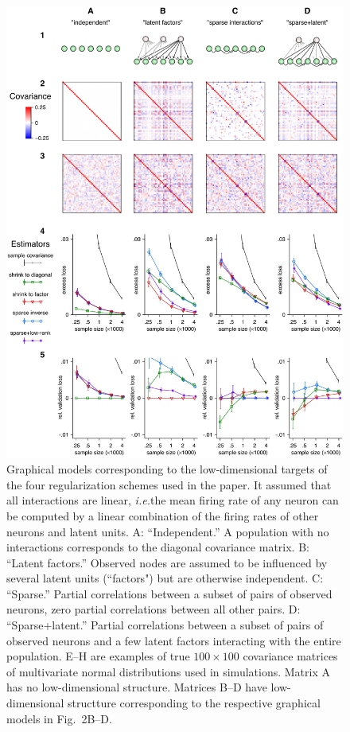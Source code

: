 \begin{figure}[htp]
\centering
\includegraphics{figures/Simulation.pdf}
\caption{
Graphical models corresponding to the low-dimensional targets of the four regularization schemes used in the paper. It assumed that all interactions are linear, \emph{i.e.}\;the mean firing rate of any neuron can be computed by a linear combination of the firing rates of other neurons and latent units.
\textsf{A}: ``Independent.'' A population with no interactions corresponds to the diagonal covariance matrix.
\textsf{B}: ``Latent factors.'' Observed nodes are assumed to be influenced by several latent units (``factors") but are otherwise independent.
\textsf{C}: ``Sparse.'' Partial correlations between a subset of pairs of observed neurons, zero partial correlations between all other pairs.  
\textsf{D}: ``Sparse+latent.''  Partial correlations between a subset of pairs of observed neurons and a few latent factors interacting with the entire population. 
{\sf E--H} are examples of true $100\times100$ covariance matrices of multivariate normal distributions used in simulations. Matrix A has no low-dimensional structure. Matrices B--D have low-dimensional structture corresponding to the respective graphical models in Fig.~2B--D.
}
\end{figure}

